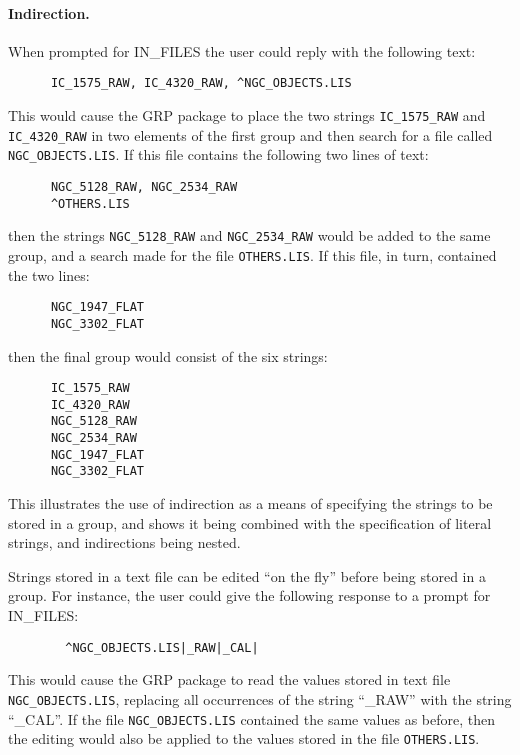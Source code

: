 \paragraph {Indirection.}
When prompted for IN\_FILES the user could reply with the following text:

\small
\begin{verbatim}
      IC_1575_RAW, IC_4320_RAW, ^NGC_OBJECTS.LIS
\end{verbatim}
\normalsize

This would cause the GRP package to place the two strings {\tt IC\_1575\_RAW}
and {\tt IC\_4320\-\_RAW} in two elements of the first group and then search
for a file called {\tt NGC\_OBJECTS.LIS}. If this file contains the following
two lines of text:

\small
\begin{verbatim}
      NGC_5128_RAW, NGC_2534_RAW
      ^OTHERS.LIS
\end{verbatim}
\normalsize

then the strings {\tt NGC\_5128\_RAW} and {\tt NGC\_2534\_RAW} would be added
to the same group, and a search made for the file {\tt OTHERS.LIS}. If this
file, in turn, contained the two lines:

\small
\begin{verbatim}
      NGC_1947_FLAT
      NGC_3302_FLAT
\end{verbatim}
\normalsize

then the final group would consist of the six strings:

\small
\begin{verbatim}
      IC_1575_RAW
      IC_4320_RAW
      NGC_5128_RAW
      NGC_2534_RAW
      NGC_1947_FLAT
      NGC_3302_FLAT
\end{verbatim}
\normalsize

This illustrates the use of indirection as a means of specifying the strings to
be stored in a group, and shows it being combined with the specification of
literal strings, and indirections being nested.

Strings stored in a text file can be edited ``on the fly'' before being stored
in a group. For instance, the user could give the following response to a prompt
for IN\_FILES:

\small
\begin{verbatim}
        ^NGC_OBJECTS.LIS|_RAW|_CAL|
\end{verbatim}
\normalsize

This would cause the GRP package to read the values stored in text file {\tt
NGC\_OBJECTS.LIS}, replacing all occurrences of the string ``\_RAW'' with the
string ``\_CAL''. If the file {\tt NGC\_OBJECTS.LIS} contained the same values
as before, then the editing would also be applied to the values stored in the
file {\tt OTHERS.LIS}.


